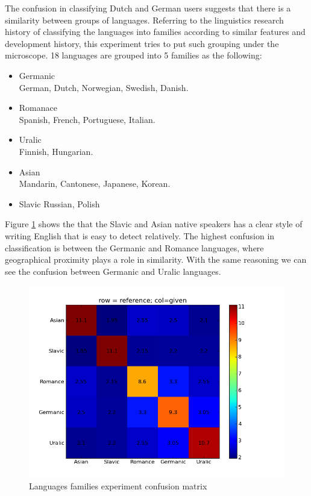 \documentclass[11pt]{article}
\begin{document}
The confusion in classifying Dutch and German users suggests that there is a similarity between groups of languages. Referring to the linguistics research history of classifying the languages into families according to similar features and development history, this experiment tries to put such grouping under the microscope. 18 languages are grouped into 5 families as the following:
\begin{itemize}
\item Germanic\\
German, Dutch, Norwegian, Swedish, Danish.
\item Romanace\\
Spanish, French, Portuguese, Italian.
\item Uralic \\
Finnish, Hungarian.
\item Asian\\
Mandarin, Cantonese, Japanese, Korean.
\item Slavic
Russian, Polish
\end{itemize}

Figure \ref{fam_cfm} shows the that the Slavic and Asian native speakers has a clear style of writing English that is easy to detect relatively. The highest confusion in classification is between the Germanic and Romance languages, where geographical proximity plays a role in similarity. With the same reasoning we can see the confusion between Germanic and Uralic languages.

\begin{figure}[htp]
\centering
\includegraphics[scale=0.45]{family_cfm.png}
\caption{Languages families experiment confusion matrix}
\label{fam_cfm}
\end{figure}
\end{document}
